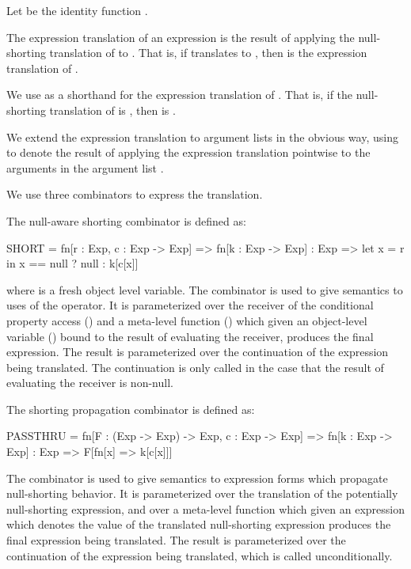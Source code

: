 \documentclass[makeidx]{article}
\begin{document}
{Let  be the identity function .

The expression translation of an expression  is the result of applying the
null-shorting translation of  to .  That is, if  translates to ,
then  is the expression translation of .

We use  as a shorthand for the expression translation of .  That is,
if the null-shorting translation of  is , then  is .

We extend the expression translation to argument lists in the obvious way, using
 to denote the result of applying the expression translation
pointwise to the arguments in the argument list .

We use three combinators to express the translation.

The null-aware shorting combinator  is defined as:
\begin{dartCode}
  SHORT = fn[r : Exp, c : Exp -> Exp] =>
              fn[k : Exp -> Exp] : Exp =>
                let x = r in x == null ? null : k[c[x]]
\end{dartCode}

where  is a fresh object level variable.  The  combinator is used to
give semantics to uses of the  operator.  It is parameterized over the
receiver of the conditional property access () and a meta-level function
() which given an object-level variable () bound to the result of
evaluating the receiver, produces the final expression.  The result is
parameterized over the continuation of the expression being translated.  The
continuation is only called in the case that the result of evaluating the
receiver is non-null.

The shorting propagation combinator  is defined as:
\begin{dartCode}
  PASSTHRU = fn[F : (Exp -> Exp) -> Exp, c : Exp -> Exp] =>
               fn[k : Exp -> Exp] : Exp => F[fn[x] => k[c[x]]]
\end{dartCode}

The  combinator is used to give semantics to expression forms which
propagate null-shorting behavior.  It is parameterized over the translation 
of the potentially null-shorting expression, and over a meta-level function 
which given an expression which denotes the value of the translated
null-shorting expression produces the final expression being translated.  The
result is parameterized over the continuation of the expression being
translated, which is called unconditionally.

}
\end{document}
